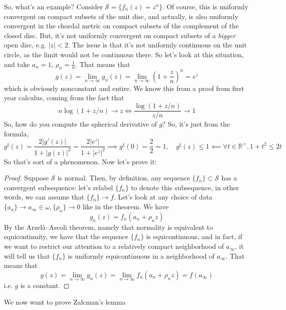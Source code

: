 \documentclass{article}
\newcommand{\mbb}[1]{\mathbb{#1}}
\newcommand{\mc}[1]{\mathcal{#1}}
\newcommand{\reals}{\mbb{R}}
\begin{document}
So, what's an example? Consider \(\mc{S} = \{f_n(z) = z^n\}\). Of course, this is uniformly convergent on compact subsets of the unit disc, and actually, is also uniformly convergent in the chordal metric on compact subsets of the complement of the closed disc. But, it's not uniformly convergent on compact subsets of a \textit{bigger} open disc, e.g. \(|z| < 2\). The issue is that it's not uniformly continuous on the unit circle, as the limit would not be continuous there. So let's look at this situation, and take \(a_n = 1\), \(\rho_n = \frac{1}{n}\). That means that
\[g(z) = \lim_{n \to \infty}g_n(z) = \lim_{n \to \infty}\left(1 + \frac{z}{n}\right)^n = e^z\]
which is obviously nonconstant and entire. We know this from a proof from first year calculus, coming from the fact that
\[n\log(1 + z/n) \to z \iff \frac{\log(1 + z/n)}{z/n} \to 1\]
So, how do you compute the spherical derivative of \(g\)? So, it's just from the formula,
\[g^\sharp(z) = \frac{2|g'(z)|}{1 + |g(z)|^2} = \frac{2|e^z|}{1 + |e^z|^2} \implies g^\sharp(0) = \frac{2}{2} = 1, \quad g^\sharp(z) \leq 1 \impliedby \forall t \in \reals^+, 1 + t^2 \leq 2t\]
So that's sort of a phenomenon. Now let's prove it:
\begin{proof}
Suppose \(\mc{S}\) is normal. Then, by definition, any sequence \(\{f_n\} \subset \mc{S}\) has a convergent subsequence: let's relabel \(\{f_n\}\) to denote this subsequence, in other words, we can assume that \(\{f_n\} \to f\). Let's look at any choice of data \(\{a_n\} \to a_\infty \in \omega, \{\rho_n\} \to 0\) like in the theorem. We have
\[g_n(z) = f_n(a_n + \rho_nz)\]
By the Arzelà–Ascoli theorem, namely that normality is equivalent to equicontinuity, we have that the sequence \(\{f_n\}\) is equicontinuous, and in fact, if we want to restrict our attention to a relatively compact neighborhood of \(a_\infty\), it will tell us that \(\{f_n\}\) is uniformly equicontinuous in a neighborhood of \(a_\infty\). That means that
\[g(z) = \lim_{n \to \infty}g_n(z) = \lim_{n \to \infty}f_n(a_n + \rho_nz) = f(a_\infty)\]
i.e. \(g\) is a constant.
\end{proof}
We now want to prove Zalcman's lemma
\end{document}
